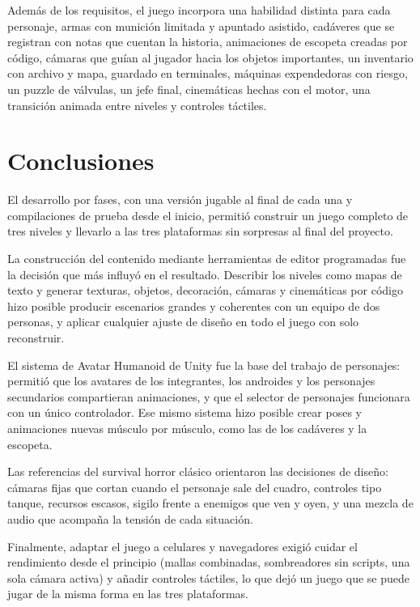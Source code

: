 Además de los requisitos, el juego incorpora una habilidad distinta para cada personaje, armas con
munición limitada y apuntado asistido, cadáveres que se registran con notas que cuentan la historia,
animaciones de escopeta creadas por código, cámaras que guían al jugador hacia los objetos
importantes, un inventario con archivo y mapa, guardado en terminales, máquinas expendedoras con
riesgo, un puzzle de válvulas, un jefe final, cinemáticas hechas con el motor, una transición
animada entre niveles y controles táctiles.

\section{Conclusiones}

El desarrollo por fases, con una versión jugable al final de cada una y compilaciones de prueba
desde el inicio, permitió construir un juego completo de tres niveles y llevarlo a las tres
plataformas sin sorpresas al final del proyecto.

La construcción del contenido mediante herramientas de editor programadas fue la decisión que más
influyó en el resultado. Describir los niveles como mapas de texto y generar texturas, objetos,
decoración, cámaras y cinemáticas por código hizo posible producir escenarios grandes y coherentes
con un equipo de dos personas, y aplicar cualquier ajuste de diseño en todo el juego con solo
reconstruir.

El sistema de Avatar Humanoid de Unity fue la base del trabajo de personajes: permitió que los
avatares de los integrantes, los androides y los personajes secundarios compartieran animaciones,
y que el selector de personajes funcionara con un único controlador. Ese mismo sistema hizo posible
crear poses y animaciones nuevas músculo por músculo, como las de los cadáveres y la escopeta.

Las referencias del survival horror clásico orientaron las decisiones de diseño: cámaras fijas que
cortan cuando el personaje sale del cuadro, controles tipo tanque, recursos escasos, sigilo frente
a enemigos que ven y oyen, y una mezcla de audio que acompaña la tensión de cada situación.

Finalmente, adaptar el juego a celulares y navegadores exigió cuidar el rendimiento desde el
principio (mallas combinadas, sombreadores sin scripts, una sola cámara activa) y añadir controles
táctiles, lo que dejó un juego que se puede jugar de la misma forma en las tres plataformas.
